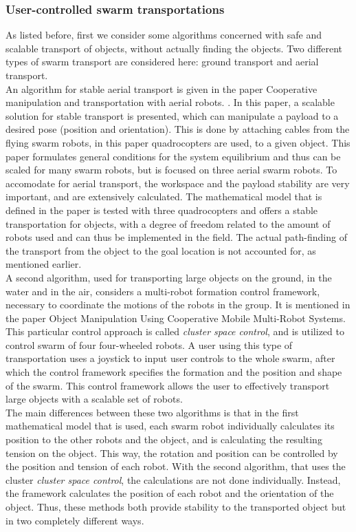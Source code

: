 \subsubsection{User-controlled swarm transportations}
As listed before, first we consider some algorithms concerned with safe and scalable transport of objects, without actually finding the objects. 
Two different types of swarm transport are considered here: ground transport and aerial transport. \\
An algorithm for stable aerial transport is given in the paper Cooperative manipulation and transportation with aerial robots. \cite{Michael2011}. 
In this paper, a scalable solution for stable transport is presented, which can manipulate a payload to a desired pose (position and orientation).
This is done by attaching cables from the flying swarm robots, in this paper quadrocopters are used, to a given object. 
This paper formulates general conditions for the system equilibrium and thus can be scaled for many swarm robots, but is focused on three aerial swarm robots. 
To accomodate for aerial transport, the workspace and the payload stability are very important, and are extensively calculated. 
The mathematical model that is defined in the paper is tested with three quadrocopters and offers a stable transportation for objects, with a degree of freedom related to the amount of robots used and can thus be implemented in the field.
The actual path-finding of the transport from the object to the goal location is not accounted for, as mentioned earlier. \\

A second algorithm, used for transporting large objects on the ground, in the water and in the air, considers a multi-robot formation control framework, necessary to coordinate the motions of the robots in the group. 
It is mentioned in the paper Object Manipulation Using Cooperative Mobile Multi-Robot Systems. \cite{Mas2012}
This particular control approach is called \emph{cluster space control}, and is utilized to control swarm of four four-wheeled robots. 
A user using this type of transportation uses a joystick to input user controls to the whole swarm, after which the control framework specifies the formation and the position and shape of the swarm.
This control framework allows the user to effectively transport large objects with a scalable set of robots.  \\

The main differences between these two algorithms is that in the first mathematical model that is used, each swarm robot individually calculates its position to the other robots and the object, and is calculating the resulting tension on the object. 
This way, the rotation and position can be controlled by the position and tension of each robot. 
With the second algorithm, that uses the cluster \emph{cluster space control}, the calculations are not done individually. 
Instead, the framework calculates the position of each robot and the orientation of the object. 
Thus, these methods both provide stability to the transported object but in two completely different ways. \\

